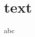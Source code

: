 \documentclass{beamer}
\begin{document}
\section{text}
\begin{frame}
    abc
\end{frame} 
\end{document}
